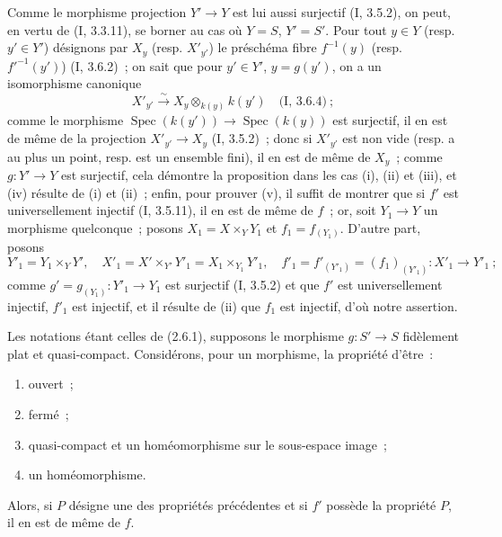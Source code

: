 Comme le morphisme projection $Y'\to Y$ est lui aussi surjectif (I, 3.5.2),
on peut, en vertu de (I, 3.3.11), se borner au cas où $Y=S$, $Y'=S'$. Pour
tout $y\in Y$ (resp. $y'\in Y'$) désignons par $X_y$ (resp. $X'_{y'}$) le
préschéma fibre $f^{-1}(y)$ (resp. $f'^{-1}(y')$) (I, 3.6.2)~; on sait que
pour $y'\in Y'$, $y=g(y')$, on a un isomorphisme canonique
\[
X'_{y'}\xrightarrow{\sim}X_y\otimes_{k(y)}k(y')\quad\text{(I, 3.6.4)}~;
\]
comme le morphisme $\operatorname{Spec}(k(y'))\to\operatorname{Spec}(k(y))$
est surjectif, il en est de même de la projection $X'_{y'}\to X_y$
(I, 3.5.2)~; donc si $X'_{y'}$ est non vide (resp. a au plus un point, resp.
est un ensemble fini), il en est de même de $X_y$~; comme $g:Y'\to Y$ est
surjectif, cela démontre la proposition dans les cas (i), (ii) et (iii), et
(iv) résulte de (i) et (ii)~; enfin, pour prouver (v), il suffit de montrer
que si $f'$ est universellement injectif (I, 3.5.11), il en est de même de
$f$~; or, soit $Y_1\to Y$ un morphisme quelconque~; posons
$X_1=X\times_Y Y_1$ et $f_1=f_{(Y_1)}$. D'autre part, posons
\[
Y'_1=Y_1\times_Y Y',\quad X'_1=X'\times_{Y'}Y'_1=X_1\times_{Y_1}Y'_1,
\quad f'_1=f'_{(Y'_1)}=(f_1)_{(Y'_1)}:X'_1\to Y'_1~;
\]
comme $g'=g_{(Y_1)}:Y'_1\to Y_1$ est surjectif (I, 3.5.2) et que $f'$ est
universellement injectif, $f'_1$ est injectif, et il résulte de (ii) que
$f_1$ est injectif, d'où notre assertion.

\begin{proposition}[2.6.2]
\label{IV.2.6.2-fr}
Les notations étant celles de (2.6.1), supposons le morphisme $g:S'\to S$
fidèlement plat et quasi-compact. Considérons, pour un morphisme, la propriété
d'être~:
\begin{enumerate}
\item[(i)] ouvert~;
\item[(ii)] fermé~;
\item[(iii)] quasi-compact et un homéomorphisme sur le sous-espace image~;
\item[(iv)] un homéomorphisme.
\end{enumerate}
Alors, si $P$ désigne une des propriétés précédentes et si $f'$ possède la
propriété $P$, il en est de même de $f$.
\end{proposition}

